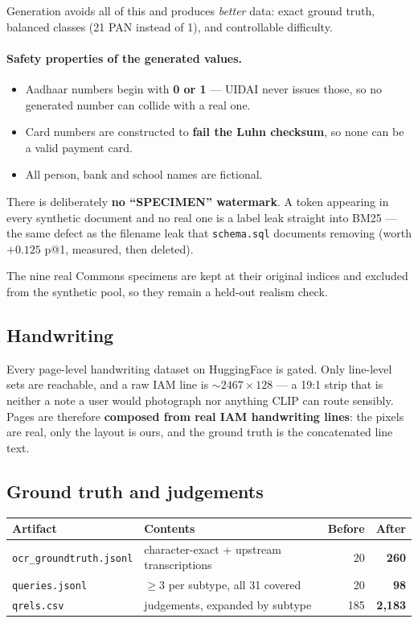 \documentclass[11pt,a4paper]{article}
\newcommand{\code}[1]{\texttt{\small #1}}
\newcommand{\best}[1]{\textbf{#1}}
\begin{document}
Generation avoids all of this and produces \emph{better} data: exact ground
truth, balanced classes (21 PAN instead of 1), and controllable difficulty.

\paragraph{Safety properties of the generated values.}
\begin{itemize}[leftmargin=1.3em,itemsep=0.15em]
  \item Aadhaar numbers begin with \textbf{0 or 1} --- UIDAI never issues those,
        so no generated number can collide with a real one.
  \item Card numbers are constructed to \textbf{fail the Luhn checksum}, so none
        can be a valid payment card.
  \item All person, bank and school names are fictional.
\end{itemize}

There is deliberately \textbf{no ``SPECIMEN'' watermark}. A token appearing in
every synthetic document and no real one is a label leak straight into BM25 ---
the same defect as the filename leak that \code{schema.sql} documents removing
(worth $+0.125$ p@1, measured, then deleted).

The nine real Commons specimens are kept at their original indices and excluded
from the synthetic pool, so they remain a held-out realism check.

\subsection{Handwriting}

Every page-level handwriting dataset on HuggingFace is gated. Only line-level
sets are reachable, and a raw IAM line is ${\sim}2467\times128$ --- a 19:1 strip
that is neither a note a user would photograph nor anything CLIP can route
sensibly. Pages are therefore \textbf{composed from real IAM handwriting lines}:
the pixels are real, only the layout is ours, and the ground truth is the
concatenated line text.

\subsection{Ground truth and judgements}

\begin{center}
\begin{tabular}{@{}llrr@{}}
\toprule
\textbf{Artifact} & \textbf{Contents} & \textbf{Before} & \textbf{After} \\
\midrule
\code{ocr\_groundtruth.jsonl} & character-exact + upstream transcriptions & 20 & \best{260} \\
\code{queries.jsonl}          & $\geq 3$ per subtype, all 31 covered      & 20 & \best{98}  \\
\code{qrels.csv}              & judgements, expanded by subtype           & 185 & \best{2{,}183} \\
\bottomrule
\end{tabular}
\end{center}
\end{document}
